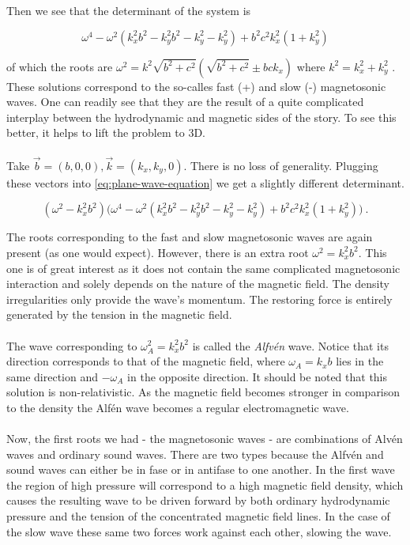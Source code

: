 Then we see that the determinant of the system is 

$$ \omega^4 - \omega^2(k_x^2 b^2 - k_y^2 b^2 - k_y^2 - k_y^2) + b^2 c^2 k_x^2(1 + k_y^2) $$

of which the roots are $ \omega^2 = k^2 \sqrt{b^2 + c^2}(\sqrt{b^2 + c^2} \pm bck_x) $ where $k^2 = k_x^2 + k_y^2$ . These solutions correspond to the so-calles fast (+) and slow (-) magnetosonic waves. One can readily see that they are the result of a quite complicated interplay between the hydrodynamic and magnetic sides of the story. To see this better, it helps to lift the problem to 3D.\\
\\
Take $ \vec{b} = (b,0,0), \vec{k} = (k_x, k_y,0) $. There is no loss of generality. Plugging these vectors into \autoref{eq:plane-wave-equation} we get a slightly different determinant.

$$ (\omega^2 - k_x^2 b^2)\big( \omega^4 - \omega^2(k_x^2 b^2 - k_y^2 b^2 - k_y^2 - k_y^2) + b^2 c^2 k_x^2(1 + k_y^2) \big) \ . $$
 
The roots corresponding to the fast and slow magnetosonic waves are again present (as one would expect). However, there is an extra root $\omega^2 = k_x^2 b^2$. This one is of great interest as it does not contain the same complicated magnetosonic interaction and solely depends on the nature of the magnetic field. The density irregularities only provide the wave's momentum. The restoring force is entirely generated by the tension in the magnetic field.\\
\\
The wave corresponding to $\omega_A^2 = k_x^2 b^2$ is called the \textit{Alfvén} wave. Notice that its direction corresponds to that of the magnetic field, where $\omega_A = k_x b$ lies in the same direction and $-\omega_A$ in the opposite direction. It should be noted that this solution is non-relativistic. As the magnetic field becomes stronger in comparison to the density the Alfén wave becomes a regular electromagnetic wave.\\
\\
Now, the first roots we had - the magnetosonic waves - are combinations of Alvén waves and ordinary sound waves. There are two types because the Alfvén and sound waves can either be in fase or in antifase to one another. In the first wave the region of high pressure will correspond to a high magnetic field density, which causes the resulting wave to be driven forward by both ordinary hydrodynamic pressure and the tension of the concentrated magnetic field lines. In the case of the slow wave these same two forces work against each other, slowing the wave.




